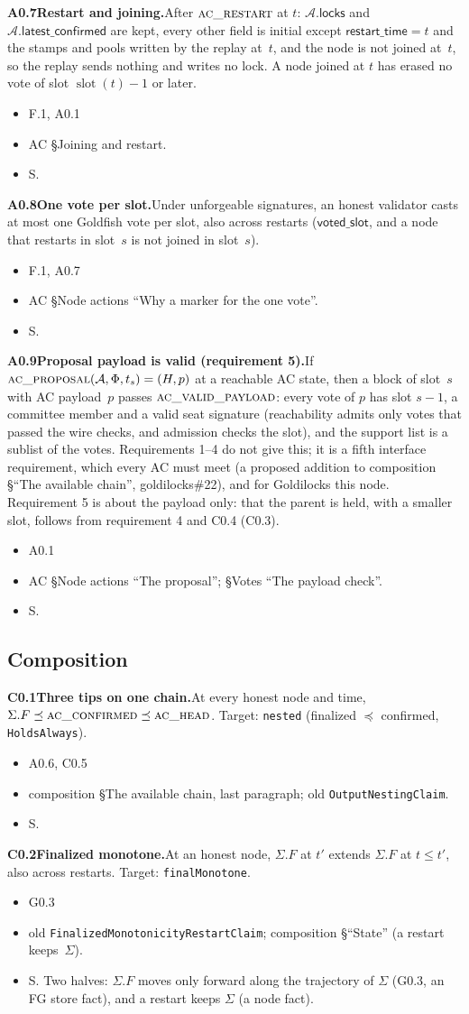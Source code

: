 \documentclass{article}
\newcommand{\slot}{\operatorname{slot}}
\newcommand{\AC}{\mathcal A}
\newcommand{\Fr}{\Phi}
\newcommand{\fname}[1]{\text{\textsc{#1}}}
\newcommand{\latestConfirmed}{\mathsf{latest\_confirmed}}
\newcommand{\dagnode}[6]{%
\par\medskip\noindent\textbf{#1\enspace #2.}\enspace #3
\begin{itemize}[leftmargin=2.2em,itemsep=0pt,topsep=2pt]
\item[\emph{Uses}] #4
\item[\emph{Evid.}] #5
\item[\emph{Task}] #6
\end{itemize}}
\begin{document}
\dagnode{A0.7}{Restart and joining}{After $\fname{ac\_restart}$ at $t$:
$\AC.\mathsf{locks}$ and $\AC.\latestConfirmed$ are kept, every other field
is initial except $\mathsf{restart\_time}=t$ and the stamps and pools
written by the replay at~$t$, and the
node is not joined at~$t$, so the replay sends nothing and writes no lock.  A
node joined at $t$ has erased no vote of slot $\slot(t)-1$ or later.}
{F.1, A0.1}{AC \S Joining and restart.}{S.}

\dagnode{A0.8}{One vote per slot}{Under unforgeable signatures, an honest
validator casts at most one Goldfish vote per slot, also across restarts
($\mathsf{voted\_slot}$, and a node that restarts in slot~$s$ is not joined in
slot~$s$).}
{F.1, A0.7}{AC \S Node actions ``Why a marker for the one vote''.}{S.}

\dagnode{A0.9}{Proposal payload is valid (requirement 5)}{If
$\fname{ac\_proposal}(\AC,\Fr,t_s)=(H,p)$ at a reachable AC state, then a block of
slot~$s$ with AC payload~$p$ passes $\fname{ac\_valid\_payload}$: every vote of
$p$ has slot $s-1$, a committee member and a valid seat signature (reachability
admits only votes that passed the wire checks, and admission checks the slot),
and the support list is a sublist of the votes.  Requirements 1--4 do not give
this; it is a fifth interface requirement, which every AC must meet (a proposed
addition to composition \S``The available chain'', goldilocks\#22), and for
Goldilocks this node.  Requirement 5 is about the payload only: that the parent
is held, with a smaller slot, follows from requirement 4 and C0.4 (C0.3).}
{A0.1}{AC \S Node actions ``The proposal''; \S Votes ``The payload check''.}{S.}

\subsection{Composition}

\dagnode{C0.1}{Three tips on one chain}{At every honest node and time,
$\Sigma.F\preceq\fname{ac\_confirmed}\preceq\fname{ac\_head}$.  Target:
\texttt{nested} (finalized $\preceq$ confirmed, \texttt{HoldsAlways}).}
{A0.6, C0.5}{composition \S The available chain, last paragraph; old
\texttt{OutputNestingClaim}.}{S.}

\dagnode{C0.2}{Finalized monotone}{At an honest node, $\Sigma.F$ at $t'$
extends $\Sigma.F$ at $t\leq t'$, also across restarts.  Target:
\texttt{finalMonotone}.}
{G0.3}{old \texttt{FinalizedMonotonicityRestartClaim}; composition \S``State'' (a
restart keeps~$\Sigma$).}{S.  Two halves: $\Sigma.F$
moves only forward along the trajectory of $\Sigma$ (G0.3, an FG store fact),
and a restart keeps $\Sigma$ (a node fact).}
\end{document}
